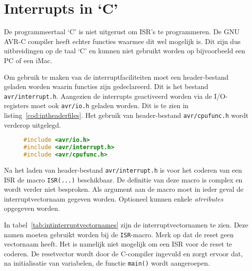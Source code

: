 \section{Interrupts in `C'}
De programmeertaal `C' is niet uitgerust om ISR's te programmeren. De GNU
AVR-C compiler heeft echter functies waarmee dit wel mogelijk is. Dit zijn dus
uitbreidingen op de taal `C' en kunnen niet gebruikt worden op bijvoorbeeld een
PC of een iMac.

Om gebruik te maken van de interruptfaciliteiten moet een header-bestand
geladen worden waarin functies zijn gedeclareerd. Dit is het bestand
\lstinline|avr/interrupt.h|. Aangezien de interrupts geactiveerd worden
via de I/O-registers moet ook \lstinline|avr/io.h| geladen worden. Dit is te
zien in listing~\ref{cod:intheaderfiles}. Het gebruik van header-bestand
\lstinline|avr/cpufunc.h| wordt verderop uitgelegd.

\begin{figure}[!ht]
\begin{lstlisting}[language=C,caption=Header-bestanden voor het gebruik van interrupts.,label=cod:intheaderfiles]
#include <avr/io.h>
#include <avr/interrupt.h>
#include <avr/cpufunc.h>
\end{lstlisting}
\end{figure}

Na het laden van header-bestand \lstinline|avr/interrupt.h| is voor het
coderen van een ISR de macro \lstinline|ISR(...)| beschikbaar. De definitie
van deze macro is complex en wordt verder niet besproken. Als argument aan
de macro moet in ieder geval de interruptvectornaam gegeven worden. Optioneel
kunnen enkele \textsl{atrributes} opgegeven worden.


In tabel~\ref{tab:intinterruptvectornames} zijn de interruptvectornamen te
zien. Deze namen moeten gebruikt worden bij de \lstinline|ISR|-macro.
Merk op dat de reset geen vectornaam heeft. Het is namelijk niet
mogelijk om een ISR voor de reset te coderen. De resetvector wordt
door de C-compiler ingevuld en zorgt ervoor dat, na initialisatie van
variabelen, de functie \lstinline|main()| wordt aangeroepen.

